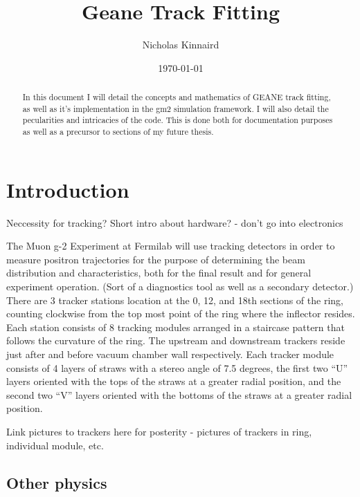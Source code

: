\documentclass{article}
\begin{document}
\title{Geane Track Fitting}
\author{Nicholas Kinnaird}
\date{\today}
\maketitle

\begin{abstract}

    In this document I will detail the concepts and mathematics of GEANE track fitting, as well as it's implementation in the gm2 simulation framework. I will also detail the pecularities and intricacies of the code. This is done both for documentation purposes as well as a precursor to sections of my future thesis.

\end{abstract}


\section{Introduction}

  Neccessity for tracking?
  Short intro about hardware? - don't go into electronics

  The Muon g-2 Experiment at Fermilab will use tracking detectors in order to measure positron trajectories for the purpose of determining the beam distribution and characteristics, both for the final result and for general experiment operation. (Sort of a diagnostics tool as well as a secondary detector.) There are 3 tracker stations location at the 0, 12, and 18th sections of the ring, counting clockwise from the top most point of the ring where the inflector resides. Each station consists of 8 tracking modules arranged in a staircase pattern that follows the curvature of the ring. The upstream and downstream trackers reside just after and before vacuum chamber wall respectively. Each tracker module consists of 4 layers of straws with a stereo angle of 7.5 degrees, the first two ``U'' layers oriented with the tops of the straws at a greater radial position, and the second two ``V'' layers oriented with the bottoms of the straws at a greater radial position.

  Link pictures to trackers here for posterity - pictures of trackers in ring, individual module, etc. 

 \subsection{Other physics}
\end{document}

